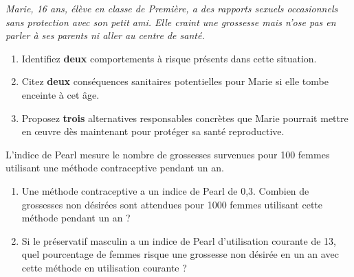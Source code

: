 \documentclass[11pt]{article}
\begin{document}
\begin{exercice}
\textit{Marie, 16 ans, élève en classe de Première, a des rapports sexuels occasionnels sans protection avec son petit ami. Elle craint une grossesse mais n'ose pas en parler à ses parents ni aller au centre de santé.}
\begin{enumerate}
    \item Identifiez \textbf{deux} comportements à risque présents dans cette situation.
    \item Citez \textbf{deux} conséquences sanitaires potentielles pour Marie si elle tombe enceinte à cet âge.
    \item Proposez \textbf{trois} alternatives responsables concrètes que Marie pourrait mettre en œuvre dès maintenant pour protéger sa santé reproductive.
\end{enumerate}
\end{exercice}

\begin{exercice}
L'indice de Pearl mesure le nombre de grossesses survenues pour 100 femmes utilisant une méthode contraceptive pendant un an.
\begin{enumerate}
    \item Une méthode contraceptive a un indice de Pearl de 0,3. Combien de grossesses non désirées sont attendues pour 1000 femmes utilisant cette méthode pendant un an ?
    \item Si le préservatif masculin a un indice de Pearl d'utilisation courante de 13, quel pourcentage de femmes risque une grossesse non désirée en un an avec cette méthode en utilisation courante ?
\end{enumerate}
\end{exercice}
\end{document}
